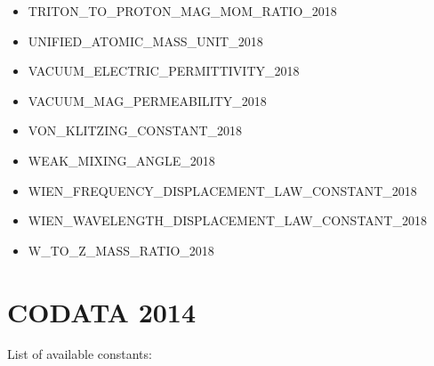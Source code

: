 \begin{itemize}
\item TRITON\_TO\_PROTON\_MAG\_MOM\_RATIO\_2018
\item UNIFIED\_ATOMIC\_MASS\_UNIT\_2018
\item VACUUM\_ELECTRIC\_PERMITTIVITY\_2018
\item VACUUM\_MAG\_PERMEABILITY\_2018
\item VON\_KLITZING\_CONSTANT\_2018
\item WEAK\_MIXING\_ANGLE\_2018
\item WIEN\_FREQUENCY\_DISPLACEMENT\_LAW\_CONSTANT\_2018
\item WIEN\_WAVELENGTH\_DISPLACEMENT\_LAW\_CONSTANT\_2018
\item W\_TO\_Z\_MASS\_RATIO\_2018
\end{itemize}

\section*{CODATA 2014}
List of available constants:

